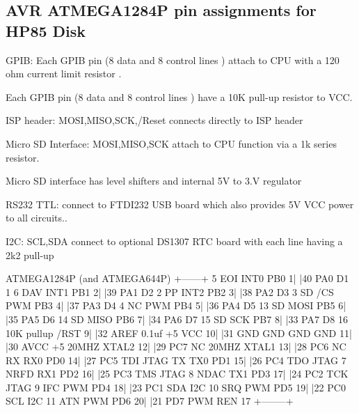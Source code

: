\subsection*{A\-V\-R A\-T\-M\-E\-G\-A1284\-P pin assignments for H\-P85 Disk}


\begin{DoxyItemize}
\item G\-P\-I\-B\-: Each G\-P\-I\-B pin (8 data and 8 control lines ) attach to C\-P\-U with a 120 ohm current limit resistor .
\begin{DoxyItemize}
\item Each G\-P\-I\-B pin (8 data and 8 control lines ) have a 10\-K pull-\/up resistor to V\-C\-C.
\end{DoxyItemize}
\item I\-S\-P header\-: M\-O\-S\-I,M\-I\-S\-O,S\-C\-K,/\-Reset connects directly to I\-S\-P header
\item Micro S\-D Interface\-: M\-O\-S\-I,M\-I\-S\-O,S\-C\-K attach to C\-P\-U function via a 1k series resistor.
\begin{DoxyItemize}
\item Micro S\-D interface has level shifters and internal 5\-V to 3.\-V regulator
\end{DoxyItemize}
\item R\-S232 T\-T\-L\-: connect to F\-T\-D\-I232 U\-S\-B board which also provides 5\-V V\-C\-C power to all circuits..
\item I2\-C\-: S\-C\-L,S\-D\-A connect to optional D\-S1307 R\-T\-C board with each line having a 2k2 pull-\/up
\end{DoxyItemize}

\begin{DoxyVerb}                   ATMEGA1284P (and ATMEGA644P) 
                   +---\/---+ 
 5 EOI INT0  PB0  1|        |40  PA0      D1  1 
 6 DAV INT1  PB1  2|        |39  PA1      D2  2 
   PP  INT2  PB2  3|        |38  PA2      D3  3 
SD /CS  PWM  PB3  4|        |37  PA3      D4  4 
   NC   PWM  PB4  5|        |36  PA4      D5 13 
SD     MOSI  PB5  6|        |35  PA5      D6 14 
SD     MISO  PB6  7|        |34  PA6      D7 15 
SD      SCK  PB7  8|        |33  PA7      D8 16 
10K pullup  /RST  9|        |32  AREF     0.1uf 
   +5        VCC 10|        |31  GND      GND   
   GND       GND 11|        |30  AVCC     +5    
20MHZ      XTAL2 12|        |29  PC7      NC    
20MHZ      XTAL1 13|        |28  PC6      NC    
   RX   RX0  PD0 14|        |27  PC5  TDI JTAG 
   TX   TX0  PD1 15|        |26  PC4  TDO JTAG 
 7 NRFD RX1  PD2 16|        |25  PC3  TMS JTAG 
 8 NDAC TX1  PD3 17|        |24  PC2  TCK JTAG 
 9 IFC  PWM  PD4 18|        |23  PC1  SDA I2C   
10 SRQ  PWM  PD5 19|        |22  PC0  SCL I2C  
11 ATN  PWM  PD6 20|        |21  PD7  PWM REN 17 
                   +--------+ 
\end{DoxyVerb}






